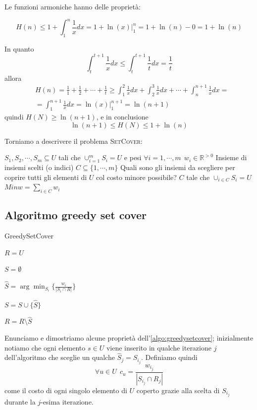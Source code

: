 \noindent
Le funzioni armoniche hanno delle proprietà:
\begin{lemma}\label{lem:harmo_leq_lnx}
	$$
		H(n) \leq 1 + \int_{1}^{n} \frac{1}{x} dx = 1 + \ln(x)|_1^n = 1 + \ln(n) - 0 = 1 + \ln(n)
	$$
\end{lemma}
\begin{lemma}\label{lem:harmo_geq_lnx1}
	In quanto
	$$
		\int_t^{t+1} \frac{1}{x} dx \leq \int_t^{t+1} \frac{1}{t} dx = \frac{1}{t}
	$$
	allora
	\begin{align*}
		 & H(n) = \frac{1}{1} + \frac{1}{2} + \cdots + \frac{1}{t} \geq \int_{1}^{2}\frac{1}{x} dx + \int_2^3 \frac{1}{x} dx + \cdots + \int_n^{n+1} \frac{1}{x} dx = \\
		 & = \int_1^{n+1}\frac{1}{x}dx = \ln(x)|_1^{n+1} = \ln(n+1)
	\end{align*}
	quindi $H(N) \geq \ln(n+1)$, e in conclusione
	$$
		\ln(n+1) \leq H(N) \leq 1 + \ln(n)
	$$
\end{lemma}

\noindent
Torniamo a descrivere il problema \textsc{SetCover}:

 {$S_1, S_2, \cdots, S_m \subseteq U$ tali che $\cup_{i = 1}^m S_i = U$
	e pesi $\forall i=1,\cdots, m ~~ w_i \in \mathbb{R}^{> 0}$ }
{Insieme di insiemi scelti (o indici) $C \subseteq \{1, \cdots, m\}$}
{Quali sono gli insiemi da scegliere per coprire tutti gli elementi di $U$ col
	costo minore possibile?} {$C$ tale che $\cup_{i \in C}S_i = U$}
{$Min$}{$w = \sum_{i \in C} w_i$}


\subsection{Algoritmo greedy set cover}
\begin{algorithm}[h]
	\caption{GreedySetCover}
	\label{algo:greedysetcover}

	$R = U$

	$S = \emptyset$

	{
		$\hat{S} = \arg \min_{S_i} \{ \frac{w_i}{|S_i \cap R|}\}$

		$S = S \cup \{\hat{S}\}$

		$R = R \setminus \hat{S}$
	}

\end{algorithm}
Enunciamo e dimostriamo alcune proprietà dell'\cref{algo:greedysetcover};
inizialmente notiamo che ogni elemento $s \in U$ viene inserito in qualche
iterazione $j$ dell'algoritmo che sceglie un qualche $\hat{S}_j =S_{i_j}$. Definiamo
quindi
$$
	\forall u \in U ~~ c_u = \frac{w_{i_j}}{|S_{i_j} \cap R_j|}
$$
come il costo di ogni singolo elemento di $U$ coperto grazie alla scelta di $S_{i_j}$
durante la $j$-esima iterazione.

